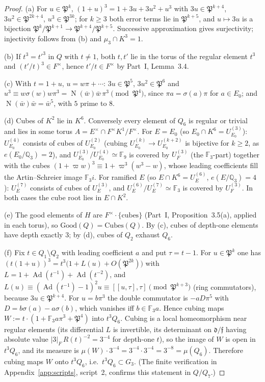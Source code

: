 \documentclass[11pt]{article}
\newcommand{\Q}{\mathbb Q}
\newcommand{\Fq}{\mathbb F}
\newcommand{\Nm}{\operatorname N}
\newcommand{\Ad}{\operatorname{Ad}}
\newcommand{\Pfr}{\mathfrak P}
\newcommand{\Cubes}{\mathrm{Cubes}}
\newcommand{\Good}{\mathrm{Good}}
\theoremstyle{plain}
\theoremstyle{definition}
\begin{document}
\begin{proof}
(a) For $u\in\Pfr^k$, $(1+u)^3=1+3u+3u^2+u^3$ with $3u\in\Pfr^{k+4}$,
$3u^2\in\Pfr^{2k+4}$, $u^3\in\Pfr^{3k}$; for $k\ge3$ both error terms
lie in $\Pfr^{k+5}$, and $u\mapsto3u$ is a bijection
$\Pfr^k/\Pfr^{k+1}\to\Pfr^{k+4}/\Pfr^{k+5}$.  Successive approximation
gives surjectivity; injectivity follows from (b) and
$\mu_3\cap K^3=1$.

(b) If $t^3=t'^3$ in $Q$ with $t\ne1$, both $t,t'$ lie in the torus
of the regular element $t^3$ and $(t'/t)^3\in F^\times$, hence
$t'/t\in F^\times$ by Part~I, Lemma~3.4.

(c) With $t=1+u$, $u=w\pi+\cdots$: $3u\in\Pfr^5$, $3u^2\in\Pfr^6$ and
$u^3\equiv w\sigma(w)w\pi^3=\Nm(\bar w)\bar w\,\pi^3 \pmod{\Pfr^4}$,
since $\pi a=\sigma(a)\pi$ for $a\in E_0$; and
$\Nm(\bar w)\bar w=\bar w^{5}$, with $5$ prime to $8$.

(d) Cubes of $K^2$ lie in $K^6$.  Conversely every element of $Q_6$ is
regular or trivial and lies in some torus $A=E^\times\cap F^\times K^1/F^\times$.
For $E=E_0$ (so $E_0\cap K^6=U^{(3)}_{E_0}$): $U^{(4)}_{E_0}$ consists of
cubes of $U^{(2)}_{E_0}$ (cubing $U^{(k)}_{E_0}\to U^{(k+2)}_{E_0}$ is bijective
for $k\ge2$, as $e(E_0/\Q_3)=2$), and $U^{(3)}_{E_0}/U^{(4)}_{E_0}\simeq\Fq_9$ is
covered by $U_F^{(3)}$ (the $\Fq_3$-part) together with the cubes
$(1+\varpi w)^3\equiv1+\varpi^3(w^3-w)$, whose leading coefficients
fill the Artin--Schreier image $\Fq_3 i$.  For ramified $E$
(so $E\cap K^6=U^{(6)}_E$, $e(E/\Q_3)=4$): $U^{(7)}_E$ consists of cubes of
$U^{(3)}_E$, and $U^{(6)}_E/U^{(7)}_E\simeq\Fq_3$ is covered by $U_F^{(3)}$.
In both cases the cube root lies in $E\cap K^2$.

(e) The good elements of $H$ are $F^\times\cdot\{\text{cubes}\}$
(Part~I, Proposition~3.5(a), applied in each torus), so
$\Good(Q)=\Cubes(Q)$.  By (c), cubes of depth-one elements have depth
exactly $3$; by (d), cubes of $Q_2$ exhaust $Q_6$.

(f) Fix $t\in Q_1\setminus Q_2$ with leading coefficient $a$ and put
$\tau=t-1$.  For $u\in\Pfr^k$ one has
$(t(1+u))^3=t^3\bigl(1+L(u)+O(\Pfr^{2k})\bigr)$ with
$L=1+\Ad(t^{-1})+\Ad(t^{-2})$, and
$L(u)\equiv(\Ad(t^{-1})-1)^2u\equiv[[u,\tau],\tau]\pmod{\Pfr^{k+3}}$
(ring commutators), because $3u\in\Pfr^{k+4}$.  For $u=b\pi^3$ the
double commutator is $-aD\pi^5$ with $D=b\sigma(a)-a\sigma(b)$, which
vanishes iff $b\in\Fq_3a$.  Hence cubing maps
$W:=t\cdot(1+\Fq_3a\pi^3+\Pfr^4)$ into $t^3Q_6$.  Cubing is a local
homeomorphism near regular elements (its differential $L$ is
invertible, its determinant on $\mathfrak d/\mathfrak f$ having absolute
value $|3|_F\,R(t)^{-2}=3^{-4}$ for depth-one $t$), so the image of
$W$ is open in $t^3Q_6$, and its measure is
$\mu(W)\cdot3^{-4}=3^{-4}\cdot3^{-4}=3^{-8}=\mu(Q_6)$.  Therefore
cubing maps $W$ onto $t^3Q_6$, i.e.\ $t^3Q_6\subset G_3$.
(The finite verification in Appendix~\ref{app:scripts}, script~2,
confirms this statement in $Q/Q_7$.)


\end{proof}
\end{document}
